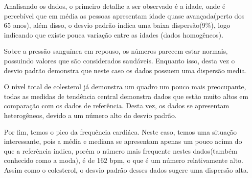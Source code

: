     Analisando os dados, o primeiro detalhe a ser observado é a idade, onde é percebível que em média
    as pessoas apresentam idade quase avançada(perto dos 65 anos), além disso, o desvio padrão indica 
    uma baixa dispersão(9\%), logo indicando que existe pouca variação entre as idades 
    (dados homogêneos).

    Sobre a pressão sanguínea em repouso, os números parecem estar normais, possuindo valores 
    que são considerados saudáveis. Enquanto isso, desta vez o desvio padrão demonstra que neste caso 
    os dados possuem uma dispersão media.

    O nível total de colesterol já demonstra um quadro um pouco mais preocupante, todas as medidas 
    de tendência central demonstra dados que estão muito altos em comparação com os dados de referência.
    Desta vez, os dados se apresentam heterogêneos, devido a um número alto do desvio padrão.

    Por fim, temos o pico da frequência cardiáca. Neste caso, temos uma situação interessante, pois 
    a média e mediana se apresentam apenas um pouco acima do que a referência indica, porém o número 
    mais frequente nestes dados(também conhecido como a moda), é de 162 bpm, o que é um número relativamente 
    alto. Assim como o colesterol, o desvio padrão desses dados sugere uma dispersão alta.

    \nocite{sobremedidascentrais}
    \nocite{colesterol}
    \nocite{frequenciacardiaca}
